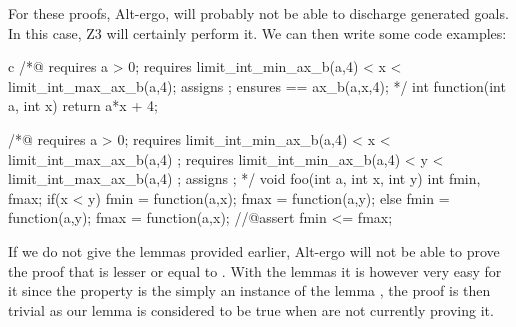 For these proofs, Alt-ergo, will probably not be able to discharge
generated goals. In this case, Z3 will certainly perform it. We can then
write some code examples:



\begin{CodeBlock}{c}
/*@
  requires a > 0;
  requires limit_int_min_ax_b(a,4) < x < limit_int_max_ax_b(a,4);
  assigns \nothing ;
  ensures \result == ax_b(a,x,4);
*/
int function(int a, int x){
  return a*x + 4;
}

/*@ 
  requires a > 0;
  requires limit_int_min_ax_b(a,4) < x < limit_int_max_ax_b(a,4) ;
  requires limit_int_min_ax_b(a,4) < y < limit_int_max_ax_b(a,4) ;
  assigns \nothing ;
*/
void foo(int a, int x, int y){
  int fmin, fmax;
  if(x < y){
    fmin = function(a,x);
    fmax = function(a,y);
  } else {
    fmin = function(a,y);
    fmax = function(a,x);
  }
  //@assert fmin <= fmax;
}
\end{CodeBlock}



If we do not give the lemmas provided earlier, Alt-ergo will not be able
to prove the proof that  is lesser or equal to
. With the lemmas it is however very easy for it since the
property is the simply an instance of the lemma
, the proof is then trivial as our lemma is
considered to be true when are not currently proving it.
